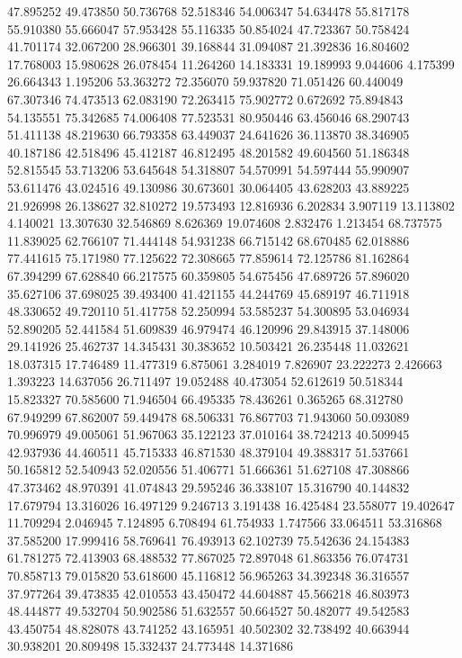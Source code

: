 47.895252
49.473850
50.736768
52.518346
54.006347
54.634478
55.817178
55.910380
55.666047
57.953428
55.116335
50.854024
47.723367
50.758424
41.701174
32.067200
28.966301
39.168844
31.094087
21.392836
16.804602
17.768003
15.980628
26.078454
11.264260
14.183331
19.189993
9.044606
4.175399
26.664343
1.195206
53.363272
72.356070
59.937820
71.051426
60.440049
67.307346
74.473513
62.083190
72.263415
75.902772
0.672692
75.894843
54.135551
75.342685
74.006408
77.523531
80.950446
63.456046
68.290743
51.411138
48.219630
66.793358
63.449037
24.641626
36.113870
38.346905
40.187186
42.518496
45.412187
46.812495
48.201582
49.604560
51.186348
52.815545
53.713206
53.645648
54.318807
54.570991
54.597444
55.990907
53.611476
43.024516
49.130986
30.673601
30.064405
43.628203
43.889225
21.926998
26.138627
32.810272
19.573493
12.816936
6.202834
3.907119
13.113802
4.140021
13.307630
32.546869
8.626369
19.074608
2.832476
1.213454
68.737575
11.839025
62.766107
71.444148
54.931238
66.715142
68.670485
62.018886
77.441615
75.171980
77.125622
72.308665
77.859614
72.125786
81.162864
67.394299
67.628840
66.217575
60.359805
54.675456
47.689726
57.896020
35.627106
37.698025
39.493400
41.421155
44.244769
45.689197
46.711918
48.330652
49.720110
51.417758
52.250994
53.585237
54.300895
53.046934
52.890205
52.441584
51.609839
46.979474
46.120996
29.843915
37.148006
29.141926
25.462737
14.345431
30.383652
10.503421
26.235448
11.032621
18.037315
17.746489
11.477319
6.875061
3.284019
7.826907
23.222273
2.426663
1.393223
14.637056
26.711497
19.052488
40.473054
52.612619
50.518344
15.823327
70.585600
71.946504
66.495335
78.436261
0.365265
68.312780
67.949299
67.862007
59.449478
68.506331
76.867703
71.943060
50.093089
70.996979
49.005061
51.967063
35.122123
37.010164
38.724213
40.509945
42.937936
44.460511
45.715333
46.871530
48.379104
49.388317
51.537661
50.165812
52.540943
52.020556
51.406771
51.666361
51.627108
47.308866
47.373462
48.970391
41.074843
29.595246
36.338107
15.316790
40.144832
17.679794
13.316026
16.497129
9.246713
3.191438
16.425484
23.558077
19.402647
11.709294
2.046945
7.124895
6.708494
61.754933
1.747566
33.064511
53.316868
37.585200
17.999416
58.769641
76.493913
62.102739
75.542636
24.154383
61.781275
72.413903
68.488532
77.867025
72.897048
61.863356
76.074731
70.858713
79.015820
53.618600
45.116812
56.965263
34.392348
36.316557
37.977264
39.473835
42.010553
43.450472
44.604887
45.566218
46.803973
48.444877
49.532704
50.902586
51.632557
50.664527
50.482077
49.542583
43.450754
48.828078
43.741252
43.165951
40.502302
32.738492
40.663944
30.938201
20.809498
15.332437
24.773448
14.371686
